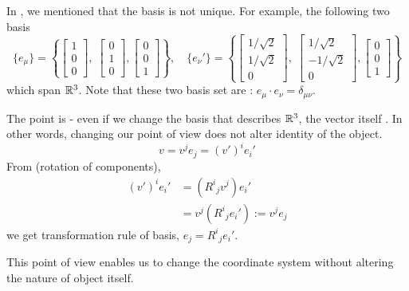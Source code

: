 \documentclass[a4paper, 10pt]{article}
\begin{document}
\begin{example}
    In , we mentioned that the basis is not unique. For example, the following two basis
    \[ \{ e_{\mu} \} = \left\{ \begin{bmatrix}1\\ 0\\ 0\end{bmatrix}, \; \begin{bmatrix}0\\ 1\\ 0\end{bmatrix}, \begin{bmatrix}0\\ 0\\ 1\end{bmatrix} \right\}, \quad \{ e_{\nu}' \} = \left\{ \begin{bmatrix}1/\sqrt{2}\\ 1/\sqrt{2}\\ 0\end{bmatrix}, \; \begin{bmatrix}1/\sqrt{2}\\ -1/\sqrt{2}\\ 0\end{bmatrix}, \begin{bmatrix}0\\ 0\\ 1\end{bmatrix} \right\} \]
    which span $\mathbb{R}^{3}$. Note that these two basis set are : $e_{\mu} \cdot e_{\nu} = \delta_{\mu\nu}$.
    
    The point is - even if we change the basis that describes $\mathbb{R}^{3}$, the vector itself . In other words, changing our point of view does not alter identity of the object.
    \[ v = v^{j}e_{j} = (v')^{i}e_{i}' \]
    From  (rotation of components),
    \begin{align*}
        (v')^{i}e_{i}' &= (R^{i}{}_{j}v^{j})e_{i}' \\
        &= v^{j}(R^{i}{}_{j}e_{i}') := v^{j}e_{j}
    \end{align*}
    we get transformation rule of basis, $e_{j} = R^{i}{}_{j}e_{i}'$.
\end{example}

\begin{remark}
    This  point of view enables us to change the coordinate system without altering the nature of object itself.
\end{remark}
\newpage
\end{document}
